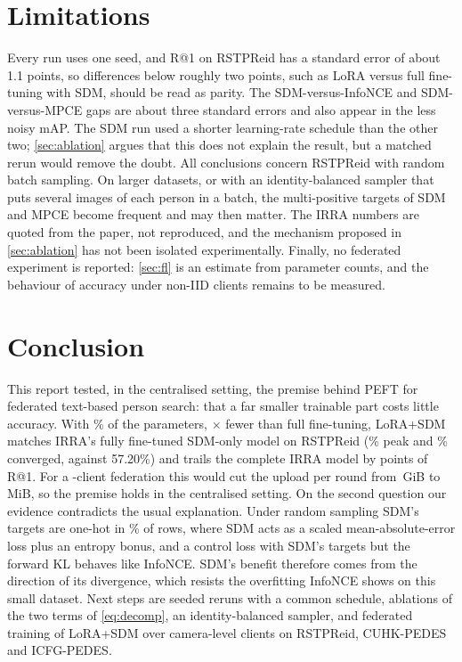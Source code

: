 \section{Limitations}\label{sec:limits}

Every run uses one seed, and R@1 on RSTPReid has a standard error of about 1.1 points, so differences below roughly two points, such as LoRA versus full fine-tuning with SDM, should be read as parity. The SDM-versus-InfoNCE and SDM-versus-MPCE gaps are about three standard errors and also appear in the less noisy mAP. The SDM run used a shorter learning-rate schedule than the other two; \cref{sec:ablation} argues that this does not explain the result, but a matched rerun would remove the doubt. All conclusions concern RSTPReid with random batch sampling. On larger datasets, or with an identity-balanced sampler that puts several images of each person in a batch, the multi-positive targets of SDM and MPCE become frequent and may then matter. The IRRA numbers are quoted from the paper, not reproduced, and the mechanism proposed in \cref{sec:ablation} has not been isolated experimentally. Finally, no federated experiment is reported: \cref{sec:fl} is an estimate from parameter counts, and the behaviour of accuracy under non-IID clients remains to be measured.

\section{Conclusion}\label{sec:conclusion}

This report tested, in the centralised setting, the premise behind PEFT for federated text-based person search: that a far smaller trainable part costs little accuracy. With \trainPct\% of the parameters, \sizeRatio$\times$ fewer than full fine-tuning, LoRA+SDM matches IRRA's fully fine-tuned SDM-only model on RSTPReid (\sdmPeakR\% peak and \sdmConvR\% converged, against 57.20\%) and trails the complete IRRA model by \gapIrraR{} points of R@1. For a \kClients-client federation this would cut the upload per round from \upFullRoundGiB\,GiB to \upLoraRoundMiB\,MiB, so the premise holds in the centralised setting. On the second question our evidence contradicts the usual explanation. Under random sampling SDM's targets are one-hot in \oneHotFrac\% of rows, where SDM acts as a scaled mean-absolute-error loss plus an entropy bonus, and a control loss with SDM's targets but the forward KL behaves like InfoNCE. SDM's benefit therefore comes from the direction of its divergence, which resists the overfitting InfoNCE shows on this small dataset. Next steps are seeded reruns with a common schedule, ablations of the two terms of \cref{eq:decomp}, an identity-balanced sampler, and federated training of LoRA+SDM over camera-level clients on RSTPReid, CUHK-PEDES and ICFG-PEDES.
